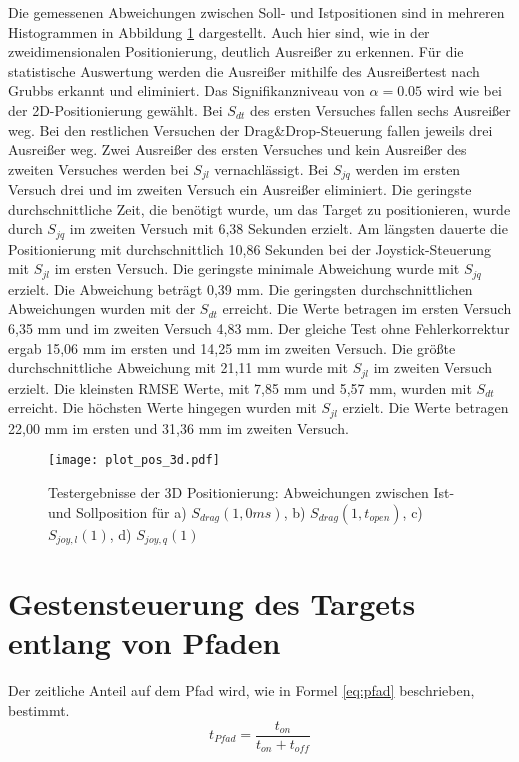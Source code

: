 Die gemessenen Abweichungen zwischen Soll- und Istpositionen sind in mehreren Histogrammen in Abbildung \ref{fig:Plot Positionierung 3D} dargestellt. Auch hier sind, wie in der zweidimensionalen Positionierung, deutlich Ausreißer zu erkennen. Für die statistische Auswertung werden die Ausreißer mithilfe des Ausreißertest nach Grubbs erkannt und eliminiert. Das Signifikanzniveau von $\alpha=0.05$ wird wie bei der 2D-Positionierung gewählt. Bei $S_{dt}$ des ersten Versuches fallen sechs Ausreißer weg. Bei den restlichen Versuchen der Drag\&Drop-Steuerung fallen jeweils drei Ausreißer weg. Zwei Ausreißer des ersten Versuches und kein Ausreißer des zweiten Versuches werden bei $S_{jl}$ vernachlässigt. Bei $S_{jq}$ werden im ersten Versuch drei und im zweiten Versuch ein Ausreißer eliminiert. Die geringste durchschnittliche Zeit, die benötigt wurde, um das Target zu positionieren, wurde durch $S_{jq}$ im zweiten Versuch mit 6,38 Sekunden erzielt. Am längsten dauerte die Positionierung mit durchschnittlich 10,86 Sekunden bei der Joystick-Steuerung mit $S_{jl}$ im ersten Versuch. Die geringste minimale Abweichung wurde mit $S_{jq}$ erzielt. Die Abweichung beträgt 0,39 mm. Die geringsten durchschnittlichen Abweichungen wurden mit der $S_{dt}$ erreicht. Die Werte betragen im ersten Versuch 6,35 mm und im zweiten Versuch 4,83 mm. Der gleiche Test ohne Fehlerkorrektur ergab 15,06 mm im ersten und 14,25 mm im zweiten Versuch. Die größte durchschnittliche Abweichung mit 21,11 mm wurde mit $S_{jl}$ im zweiten Versuch erzielt. Die kleinsten RMSE Werte, mit 7,85 mm und 5,57 mm, wurden mit $S_{dt}$ erreicht. Die höchsten Werte hingegen wurden mit $S_{jl}$ erzielt. Die Werte betragen 22,00 mm im ersten und 31,36 mm im zweiten Versuch.

\begin{figure}[htb]
	\centering
	\texttt{[image: plot\_pos\_3d.pdf]}
	\caption[Testergebnisse der 3D Positionierung]{Testergebnisse der 3D Positionierung: Abweichungen zwischen Ist- und Sollposition für a) $S_{drag}(1,0ms)$, b) $S_{drag}(1,t_{open})$, c) $S_{joy,l}(1)$, d) $S_{joy,q}(1)$}
	\label{fig:Plot Positionierung 3D}
\end{figure}


\section{Gestensteuerung des Targets entlang von Pfaden}
Der zeitliche Anteil auf dem Pfad wird, wie in Formel \ref{eq:pfad} beschrieben, bestimmt.
\begin{equation}\label{eq:pfad}
t_{Pfad}=\frac{t_{on}}{t_{on}+t_{off}}
\end{equation}

